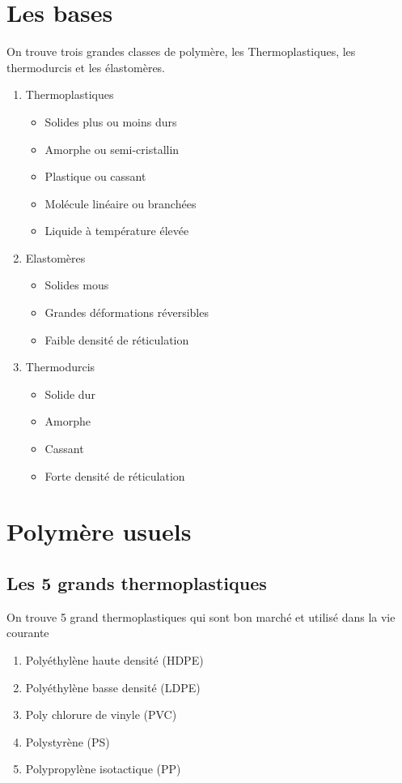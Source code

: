 \documentclass[../main.tex]{subfiles}
\begin{document}
	\section{Les bases}
	On trouve trois grandes classes de polymère, les Thermoplastiques, les thermodurcis et les élastomères. 
	\begin{enumerate}
		\item Thermoplastiques
		\begin{itemize}
			\item Solides plus ou moins durs
			\item Amorphe ou semi-cristallin
			\item Plastique ou cassant
			\item Molécule linéaire ou branchées
			\item Liquide à température élevée
		\end{itemize}
		\item Elastomères
		\begin{itemize}
			\item Solides mous
			\item Grandes déformations réversibles
			\item Faible densité de réticulation
		\end{itemize}
		\item Thermodurcis
		\begin{itemize}
			\item Solide dur
			\item Amorphe
			\item Cassant
			\item Forte densité de réticulation
		\end{itemize}
	\end{enumerate}

	\section{Polymère usuels}
		\subsection{Les 5 grands thermoplastiques}
		On trouve 5 grand thermoplastiques qui sont bon marché et utilisé dans la vie courante
		\begin{enumerate}
			\item Polyéthylène haute densité (HDPE)
			\item Polyéthylène basse densité (LDPE)
			\item Poly chlorure de vinyle (PVC)
			\item Polystyrène (PS)
			\item Polypropylène isotactique (PP)
		\end{enumerate}
\end{document}
